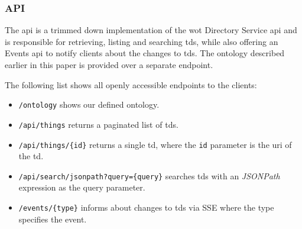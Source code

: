 \subsubsection{API}\label{sec:apibackend}

The \gls{api} is a trimmed down implementation of the \gls{wot} Directory Service \gls{api} and is responsible for retrieving, listing and searching \glspl{td}, while also offering an Events \gls{api} to notify clients about the changes to \glspl{td}. The ontology described earlier in this paper is provided over a separate endpoint.

The following list shows all openly accessible endpoints to the clients:

\begin{itemize}
    \item \lstinline|/ontology| shows our defined ontology.
    \item \lstinline|/api/things| returns a paginated list of \glspl{td}.
    \item \lstinline|/api/things/{id}| returns a single \gls{td}, where the \lstinline|id| parameter is the \gls{uri} of the \gls{td}.
    \item \lstinline|/api/search/jsonpath?query={query}| searches \glspl{td} with an \emph{JSONPath} expression as the query parameter.
    \item \lstinline|/events/{type}| informs about changes to \glspl{td} via \gls{SSE} where the type specifies the event.
\end{itemize}
